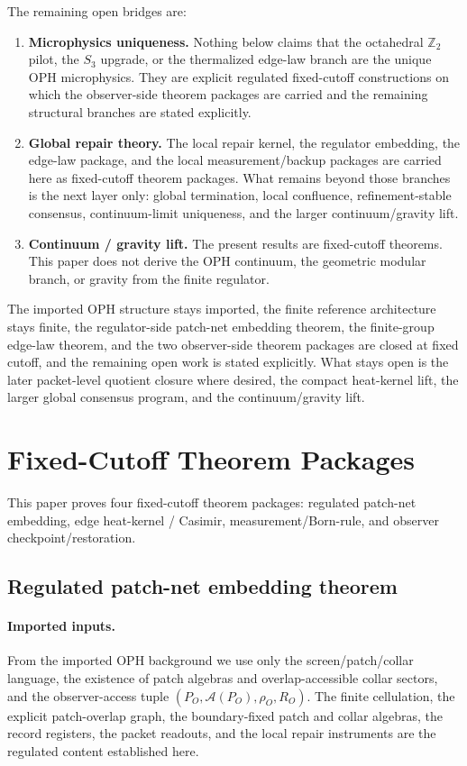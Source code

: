 \documentclass[11pt]{article}
\begin{document}
The remaining open bridges are:
\begin{enumerate}[leftmargin=2em]
\item \textbf{Microphysics uniqueness.}
Nothing below claims that the octahedral $\mathbb Z_2$ pilot, the $S_3$ upgrade, or the
thermalized edge-law branch are the unique OPH microphysics. They are explicit regulated
fixed-cutoff constructions on which the observer-side theorem packages are carried and
the remaining structural branches are stated explicitly.
\item \textbf{Global repair theory.}
The local repair kernel, the regulator embedding, the edge-law package, and the local
measurement/backup packages are carried here as fixed-cutoff theorem packages. What remains
beyond those branches is the next layer only: global termination, local confluence,
refinement-stable consensus, continuum-limit uniqueness, and the larger continuum/gravity lift.
\item \textbf{Continuum / gravity lift.}
The present results are fixed-cutoff theorems. This paper does not derive the OPH
continuum, the geometric modular branch, or gravity from the finite regulator.
\end{enumerate}

The imported OPH structure stays imported, the finite reference architecture stays finite, the
regulator-side patch-net embedding theorem, the finite-group edge-law theorem, and the two
observer-side theorem packages are closed at fixed cutoff, and the remaining open work is stated
explicitly. What stays open is the later packet-level quotient closure where desired, the
compact heat-kernel lift, the larger global consensus program, and the continuum/gravity lift.

\section{Fixed-Cutoff Theorem Packages}

This paper proves four fixed-cutoff theorem packages: regulated patch-net embedding, edge heat-kernel / Casimir, measurement/Born-rule, and observer checkpoint/restoration.

\subsection{Regulated patch-net embedding theorem}\label{sec:microphysics-feeds-a01}

\paragraph{Imported inputs.}
From the imported OPH background we use only the screen/patch/collar language, the existence of
patch algebras and overlap-accessible collar sectors, and the observer-access tuple
$(P_O,\mathcal A(P_O),\rho_O,R_O)$. The finite cellulation, the explicit patch-overlap graph,
the boundary-fixed patch and collar algebras, the record registers, the packet readouts, and the
local repair instruments are the regulated content established here.
\end{document}

